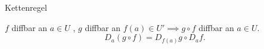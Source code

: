 \documentclass[class=article, crop=false]{standalone}
\begin{document}
\begin{zettel}{Kettenregel}
\begin{flashcard}
\begin{theorem}
    $f$ diffbar an $a \in  U$ , $g$ diffbar an $ f (a) \in  U' \implies g \circ f $ diffbar an $a \in  U$.
\[
    D_a (g \circ f) = D_{f(a)} g \circ  D_a f
.\]
\end{theorem}
\end{flashcard}
\end{zettel}
\end{document}
